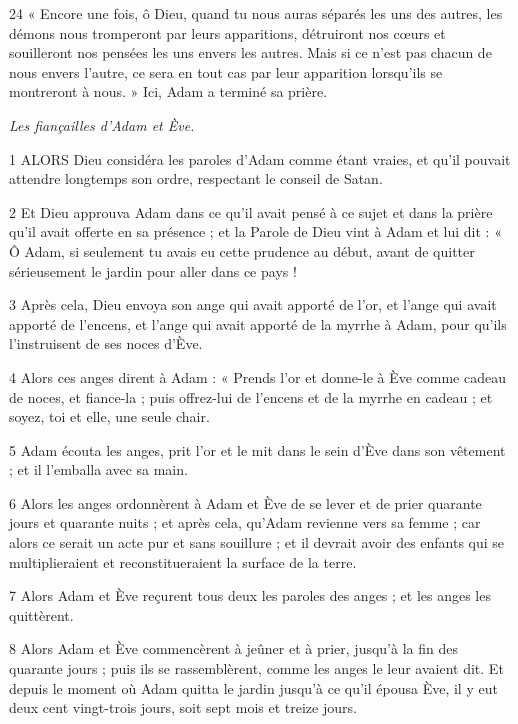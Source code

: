 \par 24 « Encore une fois, ô Dieu, quand tu nous auras séparés les uns des autres, les démons nous tromperont par leurs apparitions, détruiront nos cœurs et souilleront nos pensées les uns envers les autres. Mais si ce n’est pas chacun de nous envers l’autre, ce sera en tout cas par leur apparition lorsqu’ils se montreront à nous. » Ici, Adam a terminé sa prière.


\par \textit{Les fiançailles d'Adam et Ève.}

\par 1 ALORS Dieu considéra les paroles d'Adam comme étant vraies, et qu'il pouvait attendre longtemps son ordre, respectant le conseil de Satan.

\par 2 Et Dieu approuva Adam dans ce qu'il avait pensé à ce sujet et dans la prière qu'il avait offerte en sa présence ; et la Parole de Dieu vint à Adam et lui dit : « Ô Adam, si seulement tu avais eu cette prudence au début, avant de quitter sérieusement le jardin pour aller dans ce pays !

\par 3 Après cela, Dieu envoya son ange qui avait apporté de l'or, et l'ange qui avait apporté de l'encens, et l'ange qui avait apporté de la myrrhe à Adam, pour qu'ils l'instruisent de ses noces d'Ève.

\par 4 Alors ces anges dirent à Adam : « Prends l'or et donne-le à Ève comme cadeau de noces, et fiance-la ; puis offrez-lui de l'encens et de la myrrhe en cadeau ; et soyez, toi et elle, une seule chair.

\par 5 Adam écouta les anges, prit l'or et le mit dans le sein d'Ève dans son vêtement ; et il l'emballa avec sa main.

\par 6 Alors les anges ordonnèrent à Adam et Ève de se lever et de prier quarante jours et quarante nuits ; et après cela, qu'Adam revienne vers sa femme ; car alors ce serait un acte pur et sans souillure ; et il devrait avoir des enfants qui se multiplieraient et reconstitueraient la surface de la terre.

\par 7 Alors Adam et Ève reçurent tous deux les paroles des anges ; et les anges les quittèrent.

\par 8 Alors Adam et Ève commencèrent à jeûner et à prier, jusqu'à la fin des quarante jours ; puis ils se rassemblèrent, comme les anges le leur avaient dit. Et depuis le moment où Adam quitta le jardin jusqu'à ce qu'il épousa Ève, il y eut deux cent vingt-trois jours, soit sept mois et treize jours.

